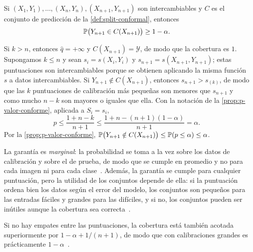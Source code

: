 \begin{teorema}\label{teo:cobertura}
Si $(X_1,Y_1),\dots,(X_n,Y_n),(X_{n+1},Y_{n+1})$ son intercambiables y $C$ es el
conjunto de predicción de la \cref{def:split-conformal}, entonces
\[
  \mathbb{P}\bigl(Y_{n+1} \in C(X_{n+1})\bigr) \ge 1-\alpha .
\]
\end{teorema}

\begin{demostracion}
Si $k > n$, entonces $\hat q = +\infty$ y $C(X_{n+1}) = \mathcal{Y}$, de modo que
la cobertura es $1$. Supongamos $k \le n$ y sean $s_i = s(X_i,Y_i)$ y
$s_{n+1} = s(X_{n+1},Y_{n+1})$; estas puntuaciones son intercambiables porque se
obtienen aplicando la misma función $s$ a datos intercambiables. Si
$Y_{n+1} \notin C(X_{n+1})$, entonces $s_{n+1} > s_{(k)}$, de modo que las $k$
puntuaciones de calibración más pequeñas son menores que $s_{n+1}$ y como mucho
$n-k$ son mayores o iguales que ella. Con la notación de la
\cref{prop:p-valor-conforme}, aplicada a $S_i = s_i$,
\[
  p \le \frac{1 + n - k}{n+1} \le \frac{1 + n - (n+1)(1-\alpha)}{n+1} = \alpha .
\]
Por la \cref{prop:p-valor-conforme},
$\mathbb{P}\bigl(Y_{n+1} \notin C(X_{n+1})\bigr) \le \mathbb{P}(p \le \alpha) \le \alpha$.
\end{demostracion}

La garantía es \emph{marginal}: la probabilidad se toma a la vez sobre los datos
de calibración y sobre el de prueba, de modo que se cumple en promedio y no para
cada imagen ni para cada clase~\cite{angelopoulos2021}.
Además, la garantía se cumple para cualquier puntuación, pero la utilidad de los
conjuntos depende de ella: si la puntuación ordena bien los datos según el error
del modelo, los conjuntos son pequeños para las entradas fáciles y grandes para
las difíciles, y si no, los conjuntos pueden ser inútiles aunque la cobertura sea
correcta~\cite{angelopoulos2021}.

Si no hay empates entre las puntuaciones, la cobertura está también acotada
superiormente por $1-\alpha+1/(n+1)$, de modo que con calibraciones grandes es
prácticamente $1-\alpha$~\cite{angelopoulos2021}.

\endinput
